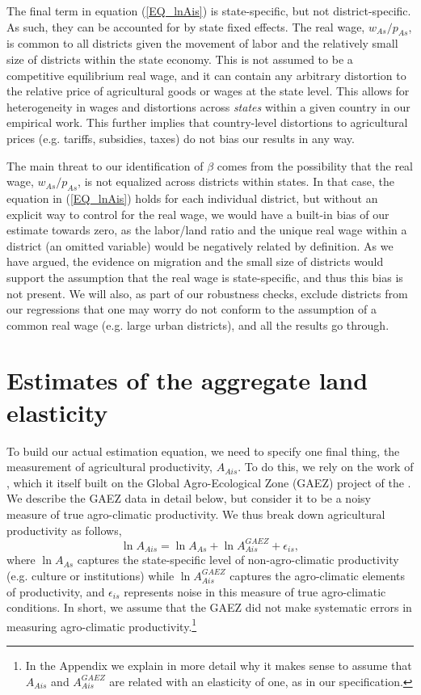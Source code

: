 \documentclass[12pt]{article}
\begin{document}
The final term in equation (\ref{EQ_lnAis}) is state-specific, but not district-specific. As such, they can be accounted for by state fixed effects. The real wage, $w_{As}/p_{As}$, is common to all districts given the movement of labor and the relatively small size of districts within the state economy. This is not assumed to be a competitive equilibrium real wage, and it can contain any arbitrary distortion to the relative price of agricultural goods or wages at the state level. This allows for heterogeneity in wages and distortions across \textit{states} within a given country in our empirical work. This further implies that country-level distortions to agricultural prices (e.g. tariffs, subsidies, taxes) do not bias our results in any way.

The main threat to our identification of $\beta$ comes from the possibility that the real wage, $w_{As}/p_{As}$, is not equalized across districts within states. In that case, the equation in (\ref{EQ_lnAis}) holds for each individual district, but without an explicit way to control for the real wage, we would have a built-in bias of our estimate towards zero, as the labor/land ratio and the unique real wage within a district (an omitted variable) would be negatively related by definition. As we have argued, the evidence on migration and the small size of districts would support the assumption that the real wage is state-specific, and thus this bias is not present. We will also, as part of our robustness checks, exclude districts from our regressions that one may worry do not conform to the assumption of a common real wage (e.g. large urban districts), and all the results go through.

\section{Estimates of the aggregate land elasticity}
To build our actual estimation equation, we need to specify one final thing, the measurement of agricultural productivity, $A_{Ais}$. To do this, we rely on the work of \cite{galorozak2016}, which it itself built on the Global Agro-Ecological Zone (GAEZ) project of the \cite{gaez}. We describe the GAEZ data in detail below, but consider it to be a noisy measure of true agro-climatic productivity. We thus break down agricultural productivity as follows,
\begin{equation*}
	\ln A_{Ais} = \ln A_{As} + \ln A^{GAEZ}_{Ais} + \epsilon_{is},
\end{equation*}
where $\ln A_{As}$ captures the state-specific level of non-agro-climatic productivity (e.g. culture or institutions) while $\ln A^{GAEZ}_{Ais}$ captures the agro-climatic elements of productivity, and $\epsilon_{is}$ represents noise in this measure of true agro-climatic conditions. In short, we assume that the GAEZ did not make systematic errors in measuring agro-climatic productivity.\footnote{In the Appendix we explain in more detail why it makes sense to assume that $A_{Ais}$ and $A^{GAEZ}_{Ais}$ are related with an elasticity of one, as in our specification.}
\end{document}
